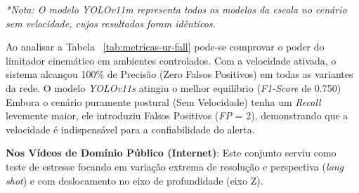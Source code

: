 \documentclass[12pt]{article}
\begin{document}
\begin{table}[h!]
\centering
\small
\caption{Métricas de detecção: Desempenho no \textit{Dataset: UR Fall Detection Dataset}.}
\label{tab:metricas-ur-fall}
\textit{*Nota: O modelo YOLOv11m representa todos os modelos da escala no cenário sem velocidade, cujos resultados foram idênticos.}
\end{table}

Ao analisar a Tabela ~\ref{tab:metricas-ur-fall} pode-se comprovar o poder do limitador cinemático em
ambientes controlados. Com a velocidade ativada, o sistema alcançou 100\% de Precisão (Zero Falsos Positivos)
em todas as variantes da rede. O modelo \textit{YOLOv11s} atingiu o melhor equilíbrio (\textit{F1-Score} de 0.750)
Embora o cenário puramente postural (Sem Velocidade) tenha um \textit{Recall} levemente maior, ele introduziu 
Falsos Positivos (\textit{FP} = 2), demonstrando que a velocidade é indispensável para a confiabilidade do alerta.


\textbf{Nos Vídeos de Domínio Público (Internet)}: Este conjunto serviu como teste de estresse focando em variação extrema de resolução e perspectiva (\textit{long shot}) e com deslocamento no eixo de profundidade (eixo Z).

\begin{table}[h!]
\centering
\small
\caption{Métricas de detecção: Desempenho no \textit{Dataset}: Vídeos Público.}
\label{tab:metricas-videos-publico}
\end{table}
\end{document}
